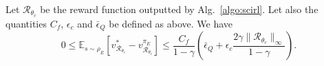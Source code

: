 \documentclass[english,utf8]{./hermes-journal}
\newcommand{\R}{\mathcal{R}}
\newcommand{\E}{\mathbb{E}}
\begin{document}
\begin{theorem}
  \label{th}
  Let $\R_{\theta_c}$ be the reward function outputted by
  Alg.~\ref{algo:scirl}. Let also the quantities $C_f$, $\epsilon_c$
  and $\bar{\epsilon}_Q$ be defined as above. We have
  \begin{equation}
    0\leq
    \E_{s\sim\rho_E}[v^*_{\R_{\theta_c}}-v^{\pi_E}_{\R_{\theta_c}}]
    \leq \frac{C_f}{1-\gamma}\left(\bar{\epsilon}_Q +
    \epsilon_c\frac{2\gamma\|\R_{\theta_c}\|_\infty}{1-\gamma}
    \right).
  \end{equation}
\end{theorem}
\end{document}
